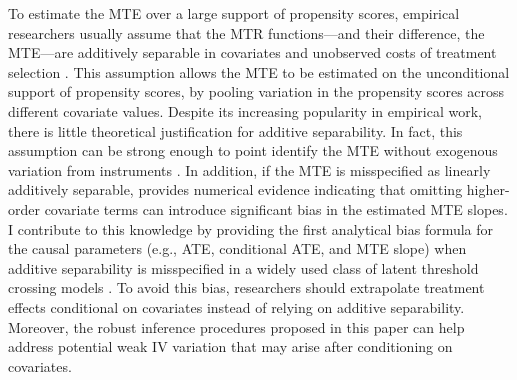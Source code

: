 \documentclass[11pt]{article}
\theoremstyle{definition}
\newcommand{\0}{\ensuremath{\mathbf{0}}}
\begin{document}
\begin{bibunit}
To estimate the MTE over a large support of propensity scores, empirical researchers usually assume that the MTR functions---and their difference, the MTE---are additively separable in covariates and unobserved costs of treatment selection \cite[Assumption 2]{brinch/mogstad/wiswall:2017}. This assumption allows the MTE to be estimated on the unconditional support of propensity scores, by pooling variation in the propensity scores across different covariate values.  Despite its increasing popularity in empirical work, there is little theoretical justification for additive separability. In fact, this assumption can be strong enough to point identify the MTE without exogenous variation from instruments \citep{pan/wang/zhang/zhou:2024}.  In addition, if the MTE is misspecified as linearly additively separable, \cite{devereux:2022} provides numerical evidence indicating that omitting higher-order covariate terms can introduce significant bias in the estimated MTE slopes. I contribute to this knowledge by providing the first analytical bias formula for the causal parameters (e.g., ATE, conditional ATE, and MTE slope) when additive separability is misspecified in a widely used class of latent threshold crossing models \citep{kline/walters:2019}. To avoid this bias, researchers should extrapolate treatment effects conditional on covariates instead of relying on additive separability. Moreover, the robust inference procedures proposed in this paper can help address potential weak IV variation that may arise after conditioning on covariates.


\end{bibunit}
\end{document}
